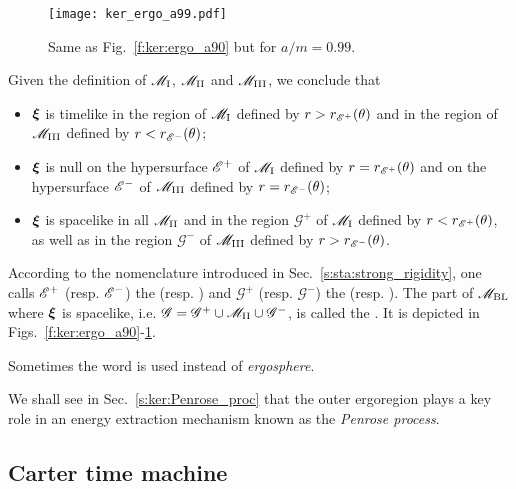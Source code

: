 \begin{figure}
\centerline{\texttt{[image: ker\_ergo\_a99.pdf]}}
\caption[]{\label{f:ker:ergo_a99} \footnotesize
Same as Fig.~\ref{f:ker:ergo_a90} but for $a/m=0.99$.
}
\end{figure}

Given the definition of $\mathscr{M}_{\rm I}$, $\mathscr{M}_{\rm II}$ and $\mathscr{M}_{\rm III}$, we conclude that
\begin{itemize}
\item $\bm{\xi}$ is timelike in the region of $\mathscr{M}_{\rm I}$ defined by $r>r_{\mathscr{E}^+}(\theta)$
and in the region of $\mathscr{M}_{\rm III}$ defined by $r<r_{\mathscr{E}^-}(\theta)$;
\item $\bm{\xi}$ is null on the hypersurface $\mathscr{E}^+$ of $\mathscr{M}_{\rm I}$ defined by
$r=r_{\mathscr{E}^+}(\theta)$
and on the hypersurface $\mathscr{E}^-$ of $\mathscr{M}_{\rm III}$ defined by $r=r_{\mathscr{E}^-}(\theta)$;
\item $\bm{\xi}$ is spacelike in all $\mathscr{M}_{\rm II}$ and in the region
$\mathscr{G}^+$ of $\mathscr{M}_{\rm I}$
defined by $r<r_{\mathscr{E}^+}(\theta)$, as well as
in the region $\mathscr{G}^-$ of $\mathscr{M}_{\rm III}$ defined by $r>r_{\mathscr{E}^-}(\theta)$.
\end{itemize}
According to the nomenclature introduced in Sec.~\ref{s:sta:strong_rigidity},
one calls $\mathscr{E}^+$ (resp. $\mathscr{E}^-$) the
(resp. )
and $\mathscr{G}^+$ (resp. $\mathscr{G}^-$) the
(resp. ).
The part of $\mathscr{M}_{\rm BL}$ where $\bm{\xi}$ is spacelike, i.e.
$\mathscr{G} = \mathscr{G}^+ \cup \mathscr{M}_{\rm II} \cup \mathscr{G}^-$,
is called the .
It is depicted in Figs.~\ref{f:ker:ergo_a90}-\ref{f:ker:ergo_a99}.
\begin{remark}
Sometimes the word  is used instead of
\emph{ergosphere}.
\end{remark}

We shall see in Sec.~\ref{s:ker:Penrose_proc} that the outer ergoregion
plays a key role in an energy extraction mechanism known as the
\emph{Penrose process}.

\subsection{Carter time machine} \label{s:ker:time_machine}

